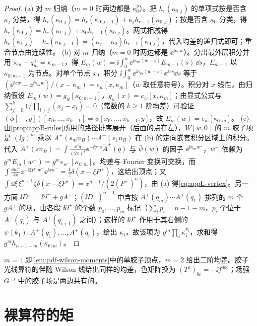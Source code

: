 \begin{proof}
(a) 对 $m$ 归纳（$m=0$ 时两边都是 $\kappa_0^p$）。把 $h_r(\kappa_{0:j})$ 的单项式按是否含 $\kappa_j$ 分类，得 $h_r(\kappa_{0:j})=h_r(\kappa_{0:j-1})+\kappa_jh_{r-1}(\kappa_{0:j})$；按是否含 $\kappa_0$ 分类，得 $h_r(\kappa_{0:j})=h_r(\kappa_{1:j})+\kappa_0h_{r-1}(\kappa_{0:j})$。两式相减得 $h_r(\kappa_{1:j})-h_r(\kappa_{0:j-1})=(\kappa_j-\kappa_0)h_{r-1}(\kappa_{0:j})$，代入均差的递归式即可；重合节点由连续性。
(b) 对 $m$ 归纳（$m=0$ 时两边都是 $\ee^{\ii\kappa_0w}$）。分出最外层积分并用 $\kappa_m-q_m^+=\kappa_{m-1}$，得 $E_m(w)=\ii\int_0^w\ee^{\ii\kappa_m(w-s)}E_{m-1}(s)\,\dd s$，$E_{m-1}$ 以 $\kappa_{0:m-1}$ 为节点。对单个节点 $x$，积分 $\ii\int_0^w\ee^{\ii\kappa_m(w-s)}\ee^{\ii xs}\dd s$ 等于 $(\ee^{\ii xw}-\ee^{\ii\kappa_mw})/(x-\kappa_m)=e_w[x,\kappa_m]$（$w$ 取任意符号）。积分对 $x$ 线性，由归纳假设 $E_m(w)=g_w[\kappa_{0:m-1}]$，$g_w(x)=e_w[x,\kappa_m]$；由显式公式与 $\sum_{j=0}^{k}1/\prod_{l\ne j}(x_j-x_l)=0$（常数的 $k\ge1$ 阶均差）可验证 $(\phi[\,\cdot\,,y])[x_0,\dots,x_{k-1}]=\phi[x_0,\dots,x_{k-1},y]$，故 $E_m(w)=e_w[\kappa_{0:m}]$。
(c) 由\cref{prop:appB-rules}所用的路径排序展开（后面的点在左），$W[w,0]$ 的 $m$ 胶子项是 $(\ii g)^m$ 乘以 $A^+(s_mn_B)\cdots A^+(s_1n_B)$ 在 (b) 的定向嵌套积分区域上的积分。代入 $A^+(sn_B)=\int\frac{\dd^4q}{(2\pi)^4}\ee^{-\ii q^+s}\tilde A^+(q)$ 与 $\bar\psi(w)$ 的因子 $\ee^{\ii\kappa_mw^-}$，$w^-$ 依赖为 $g^mE_m(w^-)=g^me_{w^-}[\kappa_{0:m}]$。均差与 Fourier 变换可交换，而 $\int\frac{\dd w^-}{4\pi}\ee^{-\ii\xi P^+w^-}\ee^{\ii xw^-}=\frac12\delta(x-\xi P^+)$，这给出顶点；又 $\int\dd\xi\,\xi^{n-1}\frac12\delta(x-\xi P^+)=x^{n-1}/(2(P^+)^n)$，由 (a) 得\cref{eq:appL-vertex}。另一方面 $\ii D^+=\ii\partial^++gA^+$；$(\ii D^+)^{n-1}$ 中含按 $A^+(q_m)\cdots A^+(q_1)$ 排列的 $m$ 个 $gA^+$ 的项，由各段 $\ii\partial^+$ 的个数 $p_0,\dots,p_m$ 标记（$\sum_ip_i=n-1-m$，$p_i$ 个位于 $A^+(q_i)$ 与 $A^+(q_{i+1})$ 之间）；这样的 $\ii\partial^+$ 作用于其右侧的 $\psi(k_1),A^+(q_1),\dots,A^+(q_i)$，给出 $\kappa_i$，故该项为 $g^m\prod_i\kappa_i^{p_i}$，求和得 $g^mh_{n-1-m}(\kappa_{0:m})$。
\end{proof}

$m=1$ 即\cref{lem:pdf-wilson-moments}中的单胶子顶点，$m=2$ 给出二阶均差。胶子光线算符的伴随 Wilson 线给出同样的均差，色矩阵换为 $(T^a)_{bc}=-\ii f^{abc}$；场强 $G^{+j}$ 中的胶子场是两边共有的。

\section{裸算符的矩}\label{sec:appL-bare}

